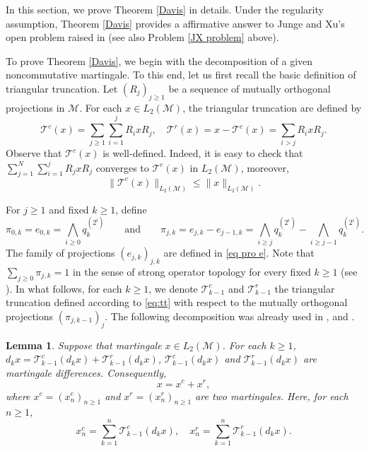 \documentclass[11]{amsart}
\numberwithin{equation}{section}
\newtheorem{lemma}[theorem]{Lemma}
\newcommand{\M}{\mathcal{M}}
\begin{document}
In this section, we prove  Theorem \ref{Davis} in details. Under the regularity assumption, Theorem \ref{Davis}  provides a affirmative answer to Junge and Xu's open problem raised in \cite[Problem 16]{JX2005} (see also Problem \ref{JX problem} above). 


To prove Theorem \ref{Davis}, we begin with the decomposition of a given noncommutative martingale. To this end, let us  first recall the basic definition of triangular truncation. Let $(R_j)_{j\geq1}$ be a sequence of mutually orthogonal projections in $\mathcal{M}$. For each $x\in L_2(\mathcal{M})$, the triangular truncation are defined by 
\begin{equation}\label{eq:tt}
	\mathcal{T}^c(x)=\sum_{j\geq1}\sum_{i=1}^jR_ixR_j,\quad \mathcal{T}^r(x)=x-\mathcal{T}^c(x)=\sum_{i> j}R_ixR_j.
\end{equation}
Observe that $\mathcal{T}^c(x)$  is well-defined. Indeed, it is easy to check that $\sum_{j=1}^N\sum_{i=1}^j R_jxR_j$ converges to $\mathcal{T}^c(x)$  in $L_2(\mathcal{M})$, moreover, 
\begin{equation}\label{T 22}
	\|\mathcal{T}^c(x)\|_{L_2(\mathcal{M})}\leq \|x\|_{L_2(\mathcal{M})}.
\end{equation}

For $j\geq1$ and fixed $k\geq1$, define
\begin{equation}\label{pi}
	\pi_{0,k}=e_{0,k}=\bigwedge_{i\geq0}q_k^{(2^i)}\qquad \mbox{and}\qquad \pi_{j,k}= e_{j,k}-e_{j-1,k}=\bigwedge_{i\geq j}q_k^{(2^i)}-\bigwedge_{i\geq j-1}q_k^{(2^i)}.
\end{equation}
The family of projections $(e_{j,k})_{j,k}$ are defined in \eqref{eq pro e}.
Note that $\sum_{j\geq0}\pi_{j,k}=1$ in the sense of strong operator topology for every fixed $k\geq1$ (see \cite[Proposition 1.4]{Rand2004}). In what follows, for each $k\geq1$, we denote $\mathcal{T}_{k-1}^c$ and $\mathcal{T}_{k-1}^r$  the triangular truncation defined according to \eqref{eq:tt} with respect to the mutually orthogonal projections $(\pi_{j,k-1})_j$. The following decomposition was already used in \cite{Rand2005}, \cite{PR2006} and \cite[eq. (4.10)]{JRWZ2020}. 

\begin{lemma}\label{decom lem 2}
	Suppose that martingale $x\in L_2(\M)$.
	For each $k\geq1$, $d_kx=\mathcal{T}_{k-1}^c(d_k x)+\mathcal{T}_{k-1}^r(d_k x)$, $\mathcal{T}_{k-1}^c(d_k x)$ and $\mathcal{T}_{k-1}^r(d_k x)$ are martingale differences. Consequently, 
	$$x=x^c+x^r,$$
	where $x^c=(x_n^c)_{n\geq1}$ and  $x^r=(x_n^r)_{n\geq1}$ are two martingales. Here, for each $n\geq1$, 
	\begin{equation}\label{xcxr}
		x_n^c=\sum_{k=1}^n\mathcal{T}_{k-1}^c(d_k x),\quad x_n^r=\sum_{k=1}^n\mathcal{T}_{k-1}^r(d_k x).
	\end{equation}
\end{lemma}
\end{document}
